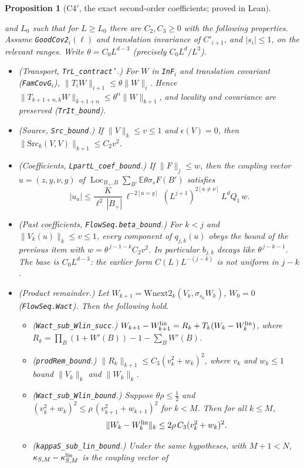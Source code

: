 \documentclass[11pt]{amsart}
\newtheorem{proposition}[theorem]{Proposition}
\theoremstyle{definition}
\theoremstyle{remark}
\numberwithin{equation}{section}
\newcommand{\E}{\mathbb{E}}
\newcommand{\Loc}{\operatorname{Loc}}
\begin{document}
\begin{proposition}[C4$'$, the exact second-order coefficients; proved in Lean]
\begin{enumerate}
  and $L_0$ such that for $L\ge L_0$ there are $C_2,C_3\ge0$ with the following properties. Assume
  \texttt{GoodCov2}$_i(\ell)$ and translation invariance of $C'_{i+1}$, and $|s_i|\le1$, on the
  relevant ranges. Write $\theta=C_0L^{d-3}$ (precisely $C_0L^d/L^3$).
  \begin{itemize}
  \item (Transport, \texttt{TrL\_contract'}.) For $W$ in \texttt{InF}$_i$ and
    translation covariant (\texttt{FamCovG}$_i$),
    $\|T_iW\|_{i+1}\le\theta\|W\|_i$. Hence $\|T_{k+1+n,k}W\|_{k+1+n}\le\theta^n\|W\|_{k+1}$,
    and locality and covariance are preserved (\texttt{TrIt\_bound}).
  \item (Source, \texttt{Src\_bound}.) If $\|V\|_k\le v\le1$ and $\epsilon(V)=0$, then
    $\|\mathrm{Src}_k(V,V)\|_{k+1}\le C_2v^2$.
  \item (Coefficients, \texttt{LpartL\_coef\_bound}.) If $\|F\|_j\le w$, then the coupling vector
    $u=(z,y,\nu,g)$ of $\Loc_{B_+,B}\sum_{B'}\E\theta\sigma_sF(B')$ satisfies
    \[
      |u_a|\le \frac{K}{\ell^2\,|B_+|}\,\ell^{-2[a=g]}\,(L^{j+1})^{2[a\ne\nu]}\,L^dQ_1\,w .
    \]
  \item (Past coefficients, \texttt{FlowSeq.beta\_bound}.) For $k<j$ and $\|V_k(u)\|_k\le v\le1$, every
    component of $q_{j,k}(u)$ obeys the bound of the previous item with
    $w=\theta^{\,j-1-k}C_2v^2$. In particular $b_{j,k}$ decays like $\theta^{\,j-k-1}$. The base is
    $C_0L^{d-3}$: the earlier form $C(L)L^{-(j-k)}$ is not uniform in $j-k$.
  \item (Product remainder.) Let $W_{k+1}=\mathrm{Wnext2}_k(V_k,\sigma_{s_k}W_k)$, $W_0=0$
    (\texttt{FlowSeq.Wact}). Then the following hold.
    \begin{itemize}
    \item (\texttt{Wact\_sub\_Wlin\_succ}.)
      $W_{k+1}-W^{\rm lin}_{k+1}=R_k+T_k(W_k-W^{\rm lin}_k)$, where
      $R_k=\prod_B(1+W'(B))-1-\sum_BW'(B)$.
    \item (\texttt{prodRem\_bound}.) $\|R_k\|_{k+1}\le C_3(v_k^2+w_k)^2$, where $v_k$ and $w_k\le1$
      bound $\|V_k\|_k$ and $\|W_k\|_k$.
    \item (\texttt{Wact\_sub\_Wlin\_bound}.) Suppose $\theta\rho\le\frac12$ and
      $(v_k^2+w_k)^2\le\rho\,(v_{k+1}^2+w_{k+1})^2$ for $k<M$. Then for all $k\le M$,
      \[\|W_k-W^{\rm lin}_k\|_k\le2\rho\,C_3(v_k^2+w_k)^2.\]
    \item (\texttt{kappaS\_sub\_lin\_bound}.) Under the same hypotheses, with $M+1<N$,
      $\kappa_{S,M}-\kappa^{\rm lin}_{S,M}$ is the coupling vector of

\end{itemize}
\end{itemize}
\end{enumerate}
\end{proposition}
\end{document}
